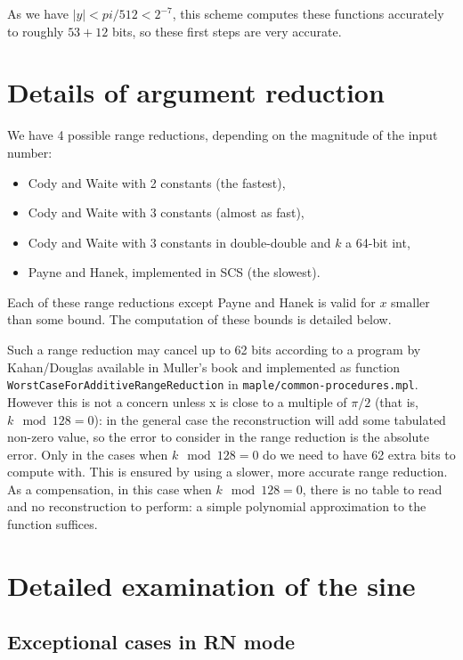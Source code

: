 As we have $|y|<pi/512<2^{-7}$, this scheme computes these functions accurately to roughly $53+12$
bits, so these first steps are  very accurate.
 



\section{Details of argument reduction}


We have 4 possible range reductions, depending on the magnitude of the input number:

\begin{itemize}
\item Cody and Waite with 2 constants (the fastest),
\item Cody and Waite with 3 constants (almost as fast),
\item Cody and Waite with 3 constants in double-double and $k$ a
  64-bit int,
\item Payne and Hanek, implemented in SCS (the slowest).
\end{itemize}
Each of these range reductions except Payne and Hanek is valid for $x$
smaller than some bound. The computation of these bounds is detailed
below.

Such a range reduction may cancel up to 62 bits according to a program
by Kahan/Douglas available in Muller's book \cite{Muller97} and
implemented as function \texttt{WorstCaseForAdditiveRangeReduction} in
\texttt{maple/common-procedures.mpl}.  However this is not a concern
unless x is close to a multiple of $\pi/2$ (that is, $k \mod 128=0$): in
the general case the reconstruction will add some tabulated non-zero
value, so the error to consider in the range reduction is the absolute
error.  Only in the cases when $k \mod 128=0$ do we need to have 62
extra bits to compute with. This is ensured by using a slower, more
accurate range reduction. As a compensation, in this case when $k \mod
128=0$, there is no table to read and no reconstruction to perform: a
simple polynomial approximation to the function suffices.






\section{Detailed examination of the sine}

\subsection{Exceptional cases in RN mode}
